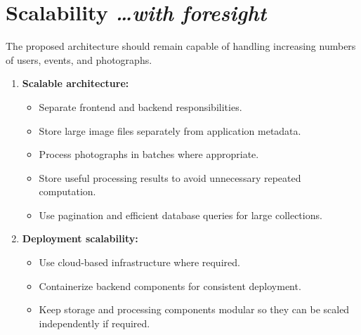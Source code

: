 \documentclass[11pt,a4paper]{article}
\newcommand{\BvrHint}[1]{%
  {\normalfont\normalsize\itshape\hfill #1}}
\begin{document}
\section{Scalability%
  \BvrHint{\ldots with foresight}}

The proposed architecture should remain capable of handling increasing
numbers of users, events, and photographs.

\begin{enumerate}[leftmargin=0.7cm]

    \item \textbf{Scalable architecture:}

    \begin{itemize}[leftmargin=0.7cm]

        \item Separate frontend and backend responsibilities.

        \item Store large image files separately from application
        metadata.

        \item Process photographs in batches where appropriate.

        \item Store useful processing results to avoid unnecessary
        repeated computation.

        \item Use pagination and efficient database queries for large
        collections.

    \end{itemize}

    \item \textbf{Deployment scalability:}

    \begin{itemize}[leftmargin=0.7cm]

        \item Use cloud-based infrastructure where required.

        \item Containerize backend components for consistent
        deployment.

        \item Keep storage and processing components modular so they
        can be scaled independently if required.

    \end{itemize}

\end{enumerate}
\end{document}
